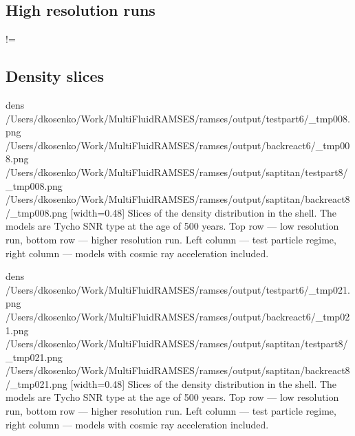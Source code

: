 \documentclass[referee,oldversion]{aa}
\def\basedir{/Users/dkosenko/Work/MultiFluidRAMSES/ramses/output}
\begin{document}
 


 \subsection{High resolution runs}

% 

% 

\if !=
\subsection{Density slices}

\FIGfo dens {\basedir/testpart6/_tmp008.png} {\basedir/backreact6/_tmp008.png}  {\basedir/saptitan/testpart8/_tmp008.png} {\basedir/saptitan/backreact8/_tmp008.png} [width=0.48\hsize] Slices of the density distribution in the shell. The models are Tycho SNR type at the age of 500 years. Top row --- low resolution run, bottom row --- higher resolution run. Left column --- test particle regime, right column --- models with cosmic ray acceleration included.

\FIGfo dens \basedir/testpart6/_tmp021.png \basedir/backreact6/_tmp021.png  \basedir/saptitan/testpart8/_tmp021.png \basedir/saptitan/backreact8/_tmp021.png [width=0.48\hsize] Slices of the density distribution in the shell. The models are Tycho SNR type at the age of 500 years. Top row --- low resolution run, bottom row --- higher resolution run. Left column --- test particle regime, right column --- models with cosmic ray acceleration included.
 
\fi


%




%
\end{document}
